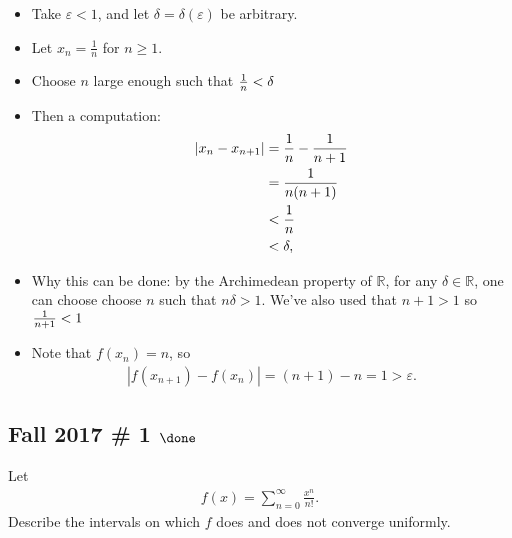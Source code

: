 \begin{solution}
\begin{itemize}
  \begin{itemize}
  \tightlist
  \item
    Take \(\varepsilon < 1\), and let \(\delta = \delta({\varepsilon})\)
    be arbitrary.
  \item
    Let \(x_n = \frac 1 n\) for \(n\geq 1\).
  \item
    Choose \(n\) large enough such that \({1\over n} < \delta\)
  \item
    Then a computation:
    \begin{align*}
    {\left\lvert {x_n - x_{n+1}} \right\rvert} 
    &= \frac 1 n - \frac 1 {n+1} \\
    &= {1\over n(n+1) } \\
    &< {1\over n} \\
    &< \delta
    ,\end{align*}
  \item
    Why this can be done: by the Archimedean property of
    \({\mathbb{R}}\), for any \(\delta\in {\mathbb{R}}\), one can choose
    choose \(n\) such that \(n\delta > 1\). We've also used that
    \(n+1 > 1\) so \({1\over n+1}< 1\)
  \item
    Note that \(f(x_n) = n\), so
    \begin{align*}
    {\left\lvert {f(x_{n+1}) - f(x_{n})} \right\rvert} = (n+1) - n = 1 > \varepsilon
    .\end{align*}
  \end{itemize}
\end{itemize}

\end{solution}

\hypertarget{fall-2017-1-done}{%
\subsection{\texorpdfstring{Fall 2017 \# 1
\(\done\)}{Fall 2017 \# 1 \textbackslash done}}\label{fall-2017-1-done}}

Let
\begin{align*}
f(x) = \sum _{n=0}^{\infty} \frac{x^{n}}{n !}.
\end{align*}
Describe the intervals on which \(f\) does and does not converge
uniformly.

